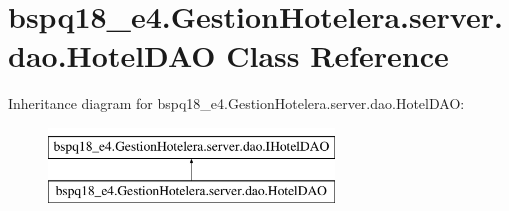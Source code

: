 \hypertarget{classbspq18__e4_1_1_gestion_hotelera_1_1server_1_1dao_1_1_hotel_d_a_o}{}\section{bspq18\+\_\+e4.\+Gestion\+Hotelera.\+server.\+dao.\+Hotel\+D\+AO Class Reference}
\label{classbspq18__e4_1_1_gestion_hotelera_1_1server_1_1dao_1_1_hotel_d_a_o}
Inheritance diagram for bspq18\+\_\+e4.\+Gestion\+Hotelera.\+server.\+dao.\+Hotel\+D\+AO\+:\begin{figure}[H]
\begin{center}
\leavevmode
\includegraphics[height=2.000000cm]{classbspq18__e4_1_1_gestion_hotelera_1_1server_1_1dao_1_1_hotel_d_a_o}
\end{center}
\end{figure}
